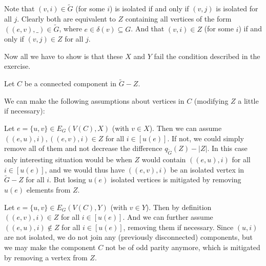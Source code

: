 \begin{exercise}{3}
    Note that $(v, i) \in \tilde{G}$ (for some $i$) is isolated if and only if
    $(v, j)$ is isolated for all $j$. Clearly both are equivalent to $Z$
    containing all vertices of the form $((e, v), \_) \in \tilde{G}$, where $e
    \in \delta(v) \subseteq G$. And that $(v, i) \in Z$ (for some $i$) if and
    only if $(v, j) \in Z$ for all $j$.

    Now all we have to show is that these $X$ and $Y$ fail the condition
    described in the exercise.

    Let $C$ be a connected component in $\tilde{G} - Z$.
    
    We can make the following assumptions about vertices in $C$ (modifying $Z$ a
    little if necessary):

    Let $e = \{u, v\} \in E_G(V(C),
    X)$ (with $v \in X$). Then we can assume $((e, u), i), ((e, v), i) \in Z$
    for all $i \in [u(e)]$. If not, we could simply remove all of them and not
    decrease the difference $q_{\tilde{G}}(Z) - |Z|$. In this case only
    interesting situation would be when $Z$ would contain $((e, u), i)$ for all
    $i \in [u(e)]$, and we would thus have $((e, v), i)$ be an isolated vertex
    in $\tilde{G} - Z$ for all $i$. But losing $u(e)$ isolated vertices is
    mitigated by removing $u(e)$ elements from $Z$.

    Let $e = \{u, v\} \in E_G(V(C), Y)$ (with $v \in Y$). Then by definition
    $((e, v), i) \in Z$ for all $i \in [u(e)]$. And we can further assume $((e,
    u), i) \notin Z$ for all $i \in [u(e)]$, removing them if necessary. Since
    $(u, i)$ are not isolated, we do not join any (previously disconnected)
    components, but we may make the component $C$ not be of odd parity anymore,
    which is mitigated by removing a vertex from $Z$.



\end{exercise}


